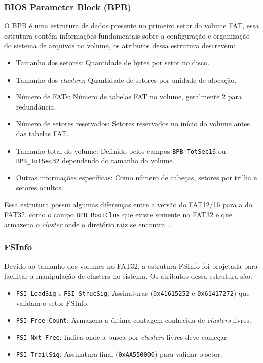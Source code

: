 \documentclass[
    12pt,				%
    oneside,   	        %
    a4paper,			%
    english,			%
    french,				%
    spanish,			%
    brazil,				%
    ]{pacotes/abntex2}
\begin{document}
\subsubsection{BIOS Parameter Block (BPB)}
\label{subsubsec:bpb}

O BPB é uma estrutura de dados presente no primeiro setor do volume FAT, essa estrutura contém informações fundamentais sobre a configuração e organização do sistema de arquivos no volume, os atributos dessa estrutura descrevem:

\begin{itemize}
    \item Tamanho dos setores: Quantidade de bytes por setor no disco.
    \item Tamanho dos \textit{clusters}: Quantidade de setores por unidade de alocação.
    \item Número de FATs: Número de tabelas FAT no volume, geralmente 2 para redundância.
    \item Número de setores reservados: Setores reservados no início do volume antes das tabelas FAT.
    \item Tamanho total do volume: Definido pelos campos \texttt{BPB\_TotSec16} ou \texttt{BPB\_TotSec32} dependendo do tamanho do volume.
    \item Outras informações específicas: Como número de cabeças, setores por trilha e setores ocultos.
\end{itemize}

Essa estrutura possui algumas diferenças entre a versão do FAT12/16 para a do FAT32, como o campo \texttt{BPB\_RootClus} que existe somente na FAT32 e que armazena o \textit{cluster} onde o diretório raiz se encontra~\cite{microsoft2000}.

\subsubsection{FSInfo}
\label{subsubsec:fsinfo}

Devido ao tamanho dos volumes no FAT32, a estrutura FSInfo foi projetada para facilitar a manipulação de clusters no sistema. Os atributos dessa estrutura são:

\begin{itemize}
    \item \texttt{FSI\_LeadSig} e \texttt{FSI\_StrucSig}: Assinaturas (\texttt{0x41615252} e \texttt{0x61417272}) que validam o setor FSInfo.
    \item \texttt{FSI\_Free\_Count}: Armazena a última contagem conhecida de \textit{clusters} livres.
    \item \texttt{FSI\_Nxt\_Free}: Indica onde a busca por \textit{clusters} livres deve começar.
    \item \texttt{FSI\_TrailSig}: Assinatura final (\texttt{0xAA550000}) para validar o setor.
\end{itemize}
\end{document}
